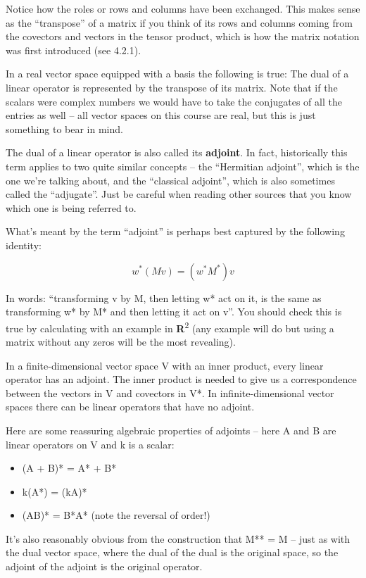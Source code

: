 \documentclass[oneside,english]{amsbook}
\numberwithin{section}{chapter}
\theoremstyle{plain}
\theoremstyle{definition}
\begin{document}
Notice how the roles or rows and columns have been exchanged. This makes
sense as the ``transpose'' of a matrix if you think of its rows and
columns coming from the covectors and vectors in the tensor product,
which is how the matrix notation was first introduced (see 4.2.1).

In a real vector space equipped with a basis the following is true: The
dual of a linear operator is represented by the transpose of its matrix.
Note that if the scalars were complex numbers we would have to take the
conjugates of all the entries as well -- all vector spaces on this
course are real, but this is just something to bear in mind.

The dual of a linear operator is also called its \textbf{adjoint}. In
fact, historically this term applies to two quite similar concepts --
the ``Hermitian adjoint'', which is the one we're talking about, and the
``classical adjoint'', which is also sometimes called the ``adjugate''.
Just be careful when reading other sources that you know which one is
being referred to.

What's meant by the term ``adjoint'' is perhaps best captured by the
following identity:

\[w^{*}(Mv) = \left( w^{*}M^{*} \right)v\]

In words: ``transforming v by M, then letting w* act on it, is the same
as transforming w* by M* and then letting it act on v''. You should
check this is true by calculating with an example in
\textbf{R}\textsuperscript{2} (any example will do but using a matrix
without any zeros will be the most revealing).

In a finite-dimensional vector space V with an inner product, every
linear operator has an adjoint. The inner product is needed to give us a
correspondence between the vectors in V and covectors in V*. In
infinite-dimensional vector spaces there can be linear operators that
have no adjoint.

Here are some reassuring algebraic properties of adjoints -- here A and
B are linear operators on V and k is a scalar:

\begin{itemize}
	\item
	(A + B)* = A* + B*
	\item
	k(A*) = (kA)*
	\item
	(AB)* = B*A* (note the reversal of order!)
\end{itemize}

It's also reasonably obvious from the construction that M** = M -- just
as with the dual vector space, where the dual of the dual is the
original space, so the adjoint of the adjoint is the original operator.
\end{document}
